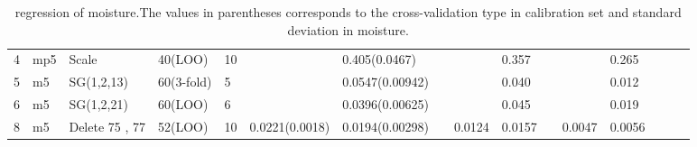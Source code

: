 \documentclass[a4paper,12pt,titlepage]{article} %
\numberwithin{equation}{section}  %
\begin{document}
\begin{landscape}
\begin{table}[]
\begin{tabular}{llllllllllllllll}
				4                    & mp5                  & Scale                & 40(LOO)    & 10 &                  & 0.405(0.0467)   &   &        & 0.357  &   &         & 0.265   &   &   &   \\
				5                    & m5                   & SG(1,2,13)           & 60(3-fold) & 5  &                  & 0.0547(0.00942) &   &        & 0.040  &   &         & 0.012   &   &   &   \\
				6                    & m5                   & SG(1,2,21)           & 60(LOO)    & 6  &                  & 0.0396(0.00625) &   &        & 0.045  &   &         & 0.019   &   &   &   \\
				8                    & m5                   & Delete 75 , 77       & 52(LOO)    & 10 & 0.0221(0.0018)   & 0.0194(0.00298) &   & 0.0124 & 0.0157 &   & 0.0047  & 0.0056  &   &   &   
			\end{tabular}
			
			\caption{regression of moisture.The values in parentheses corresponds to the cross-validation type in calibration set and standard deviation in moisture.}
			\label{tab:moisture}
		\end{table}
		
		
		
		
	\end{landscape}
	
\end{document}
